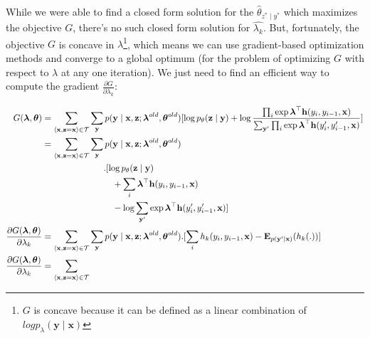 \documentclass[11pt,onecolumn]{article}
\begin{document}
While we were able to find a closed form solution for the $\hat{\theta}_{z^*\mid y^*}$ which maximizes the objective $G$, there's no such closed form solution for $\hat{\lambda_k}$. But, fortunately, the objective $G$ is concave in $\lambda$\footnote{$G$ is concave because it can be defined as a linear combination of $log p_\lambda(\mathbf{y}\mid \mathbf{x})$}, which means we can use gradient-based optimization methods and converge to a global optimum (for the problem of optimizing $G$ with respect to $\lambda$ at any one iteration). We just need to find an efficient way to compute the gradient $\frac{\partial G}{\partial \lambda_k}$:

\begin{align}
G(\boldsymbol{\lambda}, \boldsymbol{\theta}) &= 
  \sum_{\langle\mathbf{x},\mathbf{z}=\mathbf{x}\rangle \in \cal{T}} 
    \sum_\mathbf{y} 
      p(\mathbf{y}\mid\mathbf{x}, \mathbf{z}; \boldsymbol{\lambda}^{old}, \boldsymbol{\theta}^{old}) 
      [ \log p_\theta(\mathbf{z}\mid\mathbf{y}) 
        + \log
          \frac
            {\prod_i \exp \boldsymbol{\lambda}^\top \mathbf{h}(y_i, y_{i-1}, \mathbf{x})}
            {\sum_{\mathbf{y'}} \prod_i \exp \boldsymbol{\lambda}^\top \mathbf{h}(y'_i, y'_{i-1}, \mathbf{x})}  ] \\
&= 
  \sum_{\langle\mathbf{x},\mathbf{z}=\mathbf{x}\rangle \in \cal{T}} 
    \sum_\mathbf{y} 
      p(\mathbf{y}\mid\mathbf{x}, \mathbf{z}; \boldsymbol{\lambda}^{old}, \boldsymbol{\theta}^{old})  \nonumber \\
        &\qquad\qquad\qquad\quad .[ \log p_\theta(\mathbf{z}\mid\mathbf{y}) \nonumber \\
        &\qquad\qquad\qquad\qquad + \sum_i \boldsymbol{\lambda}^\top \mathbf{h}(y_i, y_{i-1}, \mathbf{x}) \nonumber \\
        &\qquad\qquad\qquad\qquad - \log \sum_{\mathbf{y'}} \exp \boldsymbol{\lambda}^\top \mathbf{h}(y'_i, y'_{i-1}, \mathbf{x}) ] \\
\frac{\partial G(\boldsymbol{\lambda}, \boldsymbol{\theta})}{\partial \lambda_k} &=
  \sum_{\langle\mathbf{x},\mathbf{z}=\mathbf{x}\rangle \in \cal{T}} 
    \sum_{\mathbf{y}}
      p(\mathbf{y}\mid\mathbf{x}, \mathbf{z}; \boldsymbol{\lambda}^{old}, \boldsymbol{\theta}^{old}) 
      . [ \sum_{i} h_k(y_i, y_{i-1}, \mathbf{x}) 
        - \mathbf{E}_{p(\mathbf{y'}\mid\mathbf{x})}(h_k(.)) ] \\
\frac{\partial G(\boldsymbol{\lambda}, \boldsymbol{\theta})}{\partial \lambda_k} &=
  \sum_{\langle\mathbf{x},\mathbf{z}=\mathbf{x}\rangle \in \cal{T}} 

\end{align}
\end{document}
